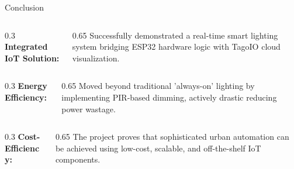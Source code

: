 \documentclass[aspectratio=169]{beamer}
\begin{document}
\begin{frame}{Conclusion}
    \begin{columns}[T]
        \begin{column}{0.3\textwidth}
            \textbf{Integrated IoT Solution:}
        \end{column}
        \begin{column}{0.65\textwidth}
            Successfully demonstrated a real-time smart lighting system bridging ESP32 hardware logic with TagoIO cloud visualization.
        \end{column}
    \end{columns}
    \vspace{0.5cm}
    \begin{columns}[T]
        \begin{column}{0.3\textwidth}
            \textbf{Energy Efficiency:}
        \end{column}
        \begin{column}{0.65\textwidth}
            Moved beyond traditional 'always-on' lighting by implementing PIR-based dimming, actively drastic reducing power wastage.
        \end{column}
    \end{columns}
    \vspace{0.5cm}
    \begin{columns}[T]
        \begin{column}{0.3\textwidth}
            \textbf{Cost-Efficiency:}
        \end{column}
        \begin{column}{0.65\textwidth}
            The project proves that sophisticated urban automation can be achieved using low-cost, scalable, and off-the-shelf IoT components.
        \end{column}
    \end{columns}
\end{frame}
\end{document}
